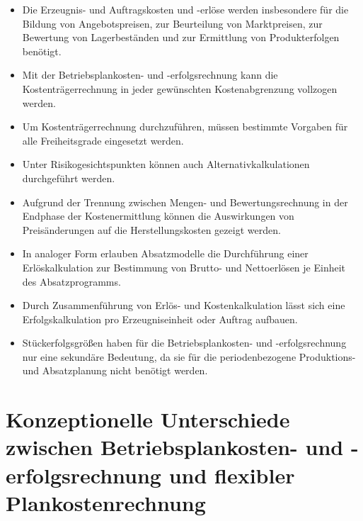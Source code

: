 \begin{itemize}
    \item Die Erzeugnis- und Auftragskosten und -erlöse werden insbesondere für die Bildung von Angebotspreisen, zur Beurteilung von Marktpreisen, zur Bewertung von Lagerbeständen und zur Ermittlung von Produkterfolgen benötigt.
    \item Mit der Betriebsplankosten- und -erfolgsrechnung kann die Kostenträgerrechnung in jeder gewünschten Kostenabgrenzung vollzogen werden.
    \item Um Kostenträgerrechnung durchzuführen, müssen bestimmte Vorgaben für alle Freiheitsgrade eingesetzt werden.
    \item Unter Risikogesichtspunkten können auch Alternativkalkulationen durchgeführt werden.
    \item Aufgrund der Trennung zwischen Mengen- und Bewertungsrechnung in der Endphase der Kostenermittlung können die Auswirkungen von Preisänderungen auf die Herstellungskosten gezeigt werden.
    \item In analoger Form erlauben Absatzmodelle die Durchführung einer Erlöskalkulation zur Bestimmung von Brutto- und Nettoerlösen je Einheit des Absatzprogramms.
    \item Durch Zusammenführung von Erlös- und Kostenkalkulation lässt sich eine Erfolgskalkulation pro Erzeugniseinheit oder Auftrag aufbauen.
    \item Stückerfolgsgrö{\ss}en haben für die Betriebsplankosten- und -erfolgsrechnung nur eine sekundäre Bedeutung, da sie für die periodenbezogene Produktions- und Absatzplanung nicht benötigt werden.
\end{itemize}

\section{Konzeptionelle Unterschiede zwischen Betriebsplankosten- und -erfolgsrechnung und flexibler Plankostenrechnung}

